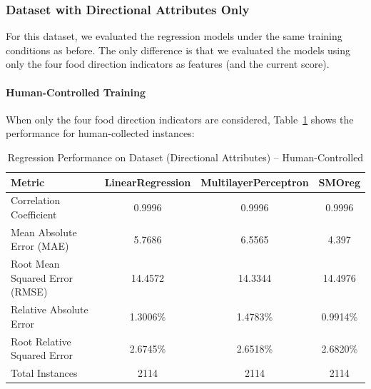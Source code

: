 \documentclass[12pt,a4paper]{article}
\begin{document}
\subsubsection{Dataset with Directional Attributes Only}

For this dataset, we evaluated the regression models under the same training conditions as before.
The only difference is that we evaluated the models using only the four food direction indicators as features (and the current score).

\paragraph{Human-Controlled Training}
When only the four food direction indicators are considered, Table~\ref{tab:dir_human} shows the performance for human-collected instances:
\begin{table}[ht]
    \caption{Regression Performance on Dataset (Directional Attributes) -- Human-Controlled}
    \label{tab:dir_human}
    \centering
    \begin{tabular}{lccc}
        \toprule
        \textbf{Metric} & \textbf{LinearRegression} & \textbf{MultilayerPerceptron} & \textbf{SMOreg} \\
        \midrule
        Correlation Coefficient & 0.9996 & 0.9996 & 0.9996 \\
        Mean Absolute Error (MAE) & 5.7686 & 6.5565 & 4.397 \\
        Root Mean Squared Error (RMSE) & 14.4572 & 14.3344 & 14.4976 \\
        Relative Absolute Error & 1.3006\% & 1.4783\% & 0.9914\% \\
        Root Relative Squared Error & 2.6745\% & 2.6518\% & 2.6820\% \\
        Total Instances & 2114 & 2114 & 2114 \\
        \bottomrule
    \end{tabular}
\end{table}
\end{document}
